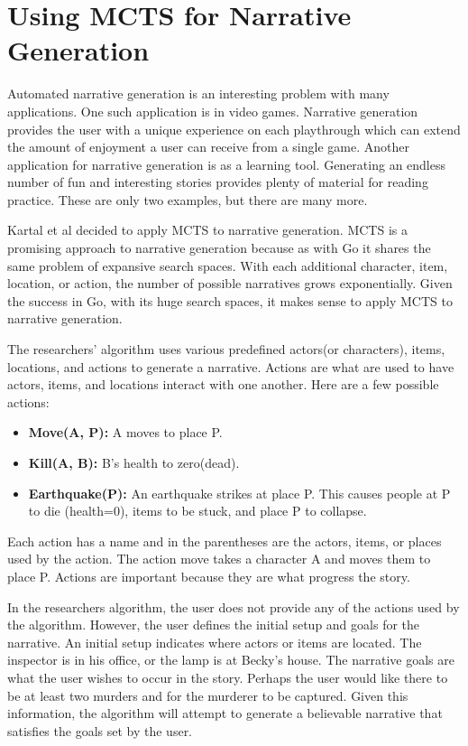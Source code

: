\documentclass{sig-alternate}
\begin{document}
\section{Using MCTS for Narrative Generation}
Automated narrative generation is an interesting problem with many applications. One such application is in video games. Narrative generation provides the user with a unique experience on each playthrough which can extend the amount of enjoyment a user can receive from a single game. Another application for narrative generation is as a learning tool. Generating an endless number of fun and interesting stories provides plenty of material for reading practice. These are only two examples, but there are many more.

Kartal et al\cite{Narrative} decided to apply MCTS to narrative generation. MCTS is a promising approach to narrative generation because as with Go it shares the same problem of expansive search spaces. With each additional character, item, location, or action, the number of possible narratives grows exponentially. Given the success in Go, with its huge search spaces, it makes sense to apply MCTS to narrative generation.

The researchers' algorithm uses various predefined actors(or characters), items, locations, and actions to generate a narrative. Actions are what are used to have actors, items, and locations interact with one another. Here are a few possible actions:
\begin{itemize}
\item \textbf{Move(A, P):} A moves to place P.
\item \textbf{Kill(A, B):} B's health to zero(dead).
\item \textbf{Earthquake(P):} An earthquake strikes at place P. This causes people at P to die (health=0), items to be stuck, and place P to collapse.
\end{itemize}
Each action has a name and in the parentheses are the actors, items, or places used by the action. The action move takes a character A and moves them to place P. Actions are important because they are what progress the story. 

In the researchers algorithm, the user does not provide any of the actions used by the algorithm. However, the user defines the initial setup and goals for the narrative. An initial setup indicates where actors or items are located. The inspector is in his office, or the lamp is at Becky's house. The narrative goals are what the user wishes to occur in the story. Perhaps the user would like there to be at least two murders and for the murderer to be captured. Given this information, the algorithm will attempt to generate a believable narrative that satisfies the goals set by the user.
\end{document}

